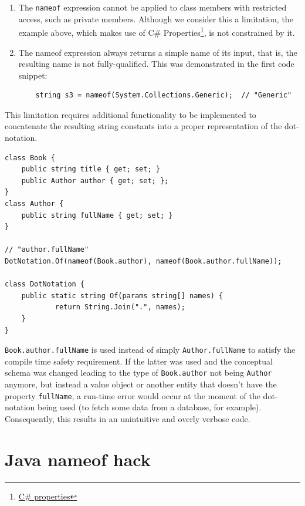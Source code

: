\begin{enumerate}
    \item The \texttt{nameof} expression cannot be applied to class members with restricted access, such as private members. Although we consider this a limitation, the example above, which makes use of C\# Properties\footnote{\href{https://docs.microsoft.com/en-us/dotnet/csharp/programming-guide/classes-and-structs/properties}{C\# properties}}, is not constrained by it.

    \item The nameof expression always returns a simple name of its input, that is, the resulting name is not fully-qualified. This was demonstrated in the first code snippet:
\begin{verbatim}
    string s3 = nameof(System.Collections.Generic);  // "Generic"
\end{verbatim}

\end{enumerate}

This limitation requires additional functionality to be implemented to concatenate the resulting string constants into a proper representation of the dot-notation.

\begin{verbatim}
class Book {
    public string title { get; set; }
    public Author author { get; set; };
}
class Author {
    public string fullName { get; set; }
}

// "author.fullName"
DotNotation.Of(nameof(Book.author), nameof(Book.author.fullName));

class DotNotation {
    public static string Of(params string[] names) {
            return String.Join(".", names);
    }
}
\end{verbatim}

\texttt{Book.author.fullName} is used instead of simply \texttt{Author.fullName} to satisfy the compile time safety requirement. If the latter was used and the conceptual schema was changed leading to the type of \texttt{Book.author} not being \texttt{Author} anymore, but instead a value object or another entity that doesn’t have the property \texttt{fullName}, a run-time error would occur at the moment of the dot-notation being used (to fetch some data from a database, for example). Consequently, this results in an unintuitive and overly verbose code.

\section{Java nameof hack}

